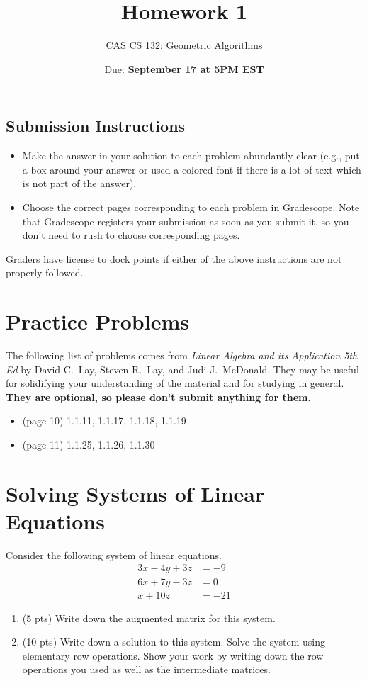 \documentclass{article}
\title{
  Homework 1
}
\author{CAS CS 132: Geometric Algorithms}
\date{Due: \textbf{September 17 at 5PM EST}}
\theoremstyle{remark}
\begin{document}
\maketitle

\subsection*{Submission Instructions}
\begin{itemize}
\item Make the answer in your solution to each problem abundantly clear (e.g., put a box around your answer or used a colored font if there is a lot of text which is not part of the answer).
\item Choose the correct pages corresponding to each problem in Gradescope. Note that Gradescope registers your submission as soon as you submit it, so you don't need to rush to choose corresponding pages.
\end{itemize}
Graders have license to dock points if either of the above instructions are not properly followed.


\section*{Practice Problems}

The following list of problems comes from \textit{Linear Algebra and its Application 5th Ed} by David C.\ Lay, Steven R.\ Lay, and Judi J.\ McDonald.
They may be useful for solidifying your understanding of the material and for studying in general.
\textbf{They are optional, so please don't submit anything for them}.

\begin{itemize}
\item
  (page 10) 1.1.11, 1.1.17, 1.1.18, 1.1.19
\item
  (page 11) 1.1.25, 1.1.26, 1.1.30
\end{itemize}

\pagebreak
\section{Solving Systems of Linear Equations}

Consider the following system of linear equations.
\begin{align*}
  3x - 4y + 3z &= -9 \\
  6x + 7y - 3z &= 0 \\
  x + 10z &= -21
\end{align*}
\begin{enumerate}
\item (5 pts) Write down the augmented matrix for this system.
\item (10 pts)
  Write down a solution to this system.
  Solve the system using elementary row operations.
  Show your work by writing down the row operations you used as well as the intermediate matrices.
\end{enumerate}
\end{document}
